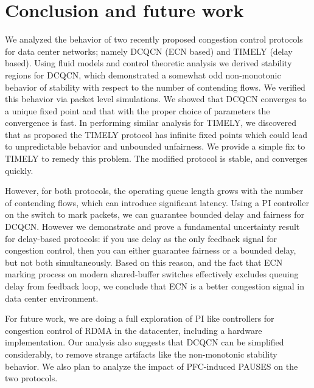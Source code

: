 \vspace{-0.5em}
\section{Conclusion and future work}
We analyzed  the behavior of two recently proposed congestion control protocols
for data center networks; namely DCQCN (ECN based) and TIMELY (delay based).
Using fluid models and control theoretic analysis we derived stability regions
for DCQCN, which demonstrated a somewhat odd non-monotonic behavior of stability
with respect to the number of contending flows. We verified this behavior via
packet level simulations. We showed that DCQCN converges to a unique
fixed point and that with the proper choice of parameters the convergence is
fast. In performing similar analysis for TIMELY, we discovered that as proposed
the TIMELY protocol has infinite fixed points which could lead to unpredictable
behavior and unbounded unfairness. We provide a simple fix to TIMELY to remedy
this problem. The modified protocol is stable, and converges quickly.

However, for both protocols, the operating queue length grows with the number of
contending flows, which can introduce significant latency. Using a PI controller
on the switch to mark packets, we can guarantee bounded delay and fairness for
DCQCN.  However we demonstrate and prove a fundamental uncertainty result for
delay-based protocols: if you use delay as the only feedback signal for
congestion control, then you can either guarantee fairness or a bounded delay,
but not both simultaneously. Based on this reason, and the fact that ECN marking
process on modern shared-buffer switches effectively excludes queuing delay from
feedback loop, we conclude that ECN is a better congestion signal in data center
environment. 

For future work, we are doing a full exploration of PI like controllers for
congestion control of RDMA in the datacenter, including a hardware
implementation. Our analysis also suggests that DCQCN can be simplified
considerably, to remove strange artifacts like the non-monotonic stability
behavior. We also plan to analyze the impact of PFC-induced PAUSES on the two
protocols.


